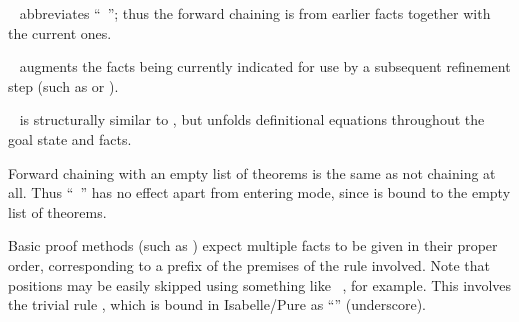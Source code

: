 \begin{isabellebody}
\begin{isamarkuptext}
\begin{description}
  \item \hyperlink{command.with}{\mbox{}}~ abbreviates ``\hyperlink{command.from}{\mbox{}}~''; thus the forward chaining
  is from earlier facts together with the current ones.
  
  \item \hyperlink{command.using}{\mbox{}}~ augments the facts being
  currently indicated for use by a subsequent refinement step (such as
  \hyperlink{command.apply}{\mbox{}} or \hyperlink{command.proof}{\mbox{}}).
  
  \item \hyperlink{command.unfolding}{\mbox{}}~ is structurally
  similar to \hyperlink{command.using}{\mbox{}}, but unfolds definitional equations
   throughout the goal state and facts.

  \end{description}

  Forward chaining with an empty list of theorems is the same as not
  chaining at all.  Thus ``\hyperlink{command.from}{\mbox{}}~'' has no
  effect apart from entering  mode, since
  \hyperlink{fact.nothing}{\mbox{}} is bound to the empty list of theorems.

  Basic proof methods (such as \hyperlink{method.rule}{\mbox{}}) expect multiple
  facts to be given in their proper order, corresponding to a prefix
  of the premises of the rule involved.  Note that positions may be
  easily skipped using something like \hyperlink{command.from}{\mbox{}}~, for example.  This involves the trivial rule
  , which is bound in Isabelle/Pure as
  ``\hyperlink{fact.underscore}{\mbox{\isa{{\isacharunderscore}}}}'' (underscore).


\end{isamarkuptext}
\end{isabellebody}
